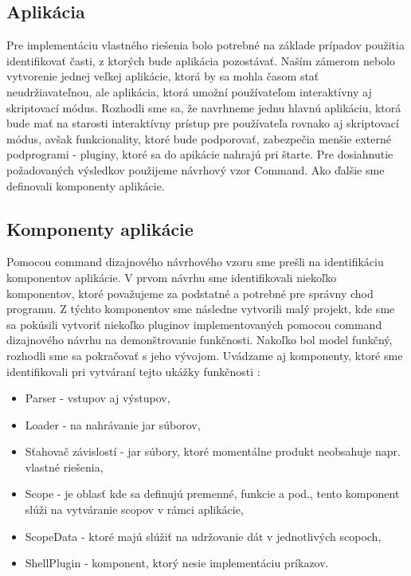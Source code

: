 {\subsection{Aplikácia}
\indent Pre implementáciu vlastného riešenia bolo potrebné na základe prípadov použitia identifikovať časti, z ktorých bude aplikácia pozostávať. Naším zámerom nebolo vytvorenie jednej veľkej aplikácie, ktorá by sa mohla časom stať neudržiavateľnou, ale aplikácia, ktorá umožní používateľom interaktívny aj skriptovací módus. Rozhodli sme sa, že navrhneme jednu hlavnú aplikáciu, ktorá bude mať na starosti interaktívny prístup pre používateľa rovnako aj skriptovací módus, avšak funkcionality, ktoré bude podporovať, zabezpečia menšie externé podprogrami - pluginy, ktoré sa do apikácie nahrajú pri štarte. Pre dosiahnutie požadovaných výsledkov použijeme návrhový vzor Command. Ako ďalšie sme definovali komponenty aplikácie.

\subsection{Komponenty aplikácie}
\indent Pomocou command dizajnového návrhového vzoru sme prešli na identifikáciu komponentov aplikácie. V prvom návrhu sme identifikovali niekoľko komponentov, ktoré považujeme za podstatné a potrebné pre správny chod programu. Z týchto komponentov sme následne vytvorili malý projekt, kde sme sa pokúsili vytvoriť niekoľko pluginov implementovaných pomocou command dizajnového návrhu na demonštrovanie funkčnosti. Nakoľko bol model funkčný, rozhodli sme sa pokračovať s jeho vývojom. Uvádzame aj komponenty, ktoré sme identifikovali pri vytváraní tejto ukážky funkčnosti : 
\begin{itemize}
	\item Parser - vstupov aj výstupov,
	\item Loader - na nahrávanie  \acrshort{jar} súborov,
	\item Sťahovač závislostí - \acrshort{jar} súbory, ktoré momentálne produkt neobsahuje napr. vlastné riešenia,
	\item Scope - je oblasť kde sa definujú premenné, funkcie a pod., tento komponent slúži na vytváranie scopov v rámci aplikácie,
	\item ScopeData - ktoré majú slúžiť na udržovanie dát v jednotlivých scopoch,
	\item ShellPlugin - komponent, ktorý nesie implementáciu príkazov.
\end{itemize}

}
